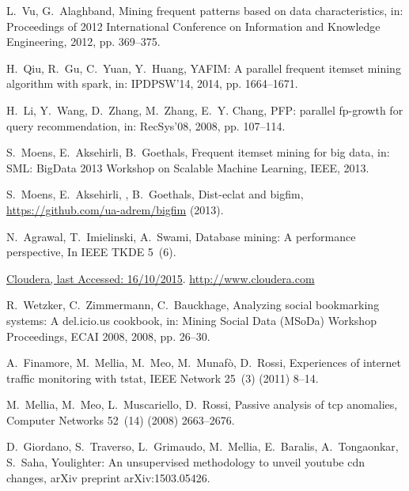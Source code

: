 \documentclass[preprint,review,12pt]{elsarticle}
\begin{document}
\begin{thebibliography}{10}
L.~Vu, G.~Alaghband, Mining frequent patterns based on data characteristics,
  in: Proceedings of 2012 International Conference on Information and Knowledge
  Engineering, 2012, pp. 369--375.

H.~Qiu, R.~Gu, C.~Yuan, Y.~Huang, {YAFIM}: A parallel frequent itemset mining
  algorithm with spark, in: IPDPSW'14, 2014, pp. 1664--1671.

H.~Li, Y.~Wang, D.~Zhang, M.~Zhang, E.~Y. Chang, {PFP}: parallel fp-growth for
  query recommendation, in: RecSys'08, 2008, pp. 107--114.

S.~Moens, E.~Aksehirli, B.~Goethals, Frequent itemset mining for big data, in:
  SML: BigData 2013 Workshop on Scalable Machine Learning, IEEE, 2013.

S.~Moens, E.~Aksehirli, , B.~Goethals, Dist-eclat and bigfim,
  \url{https://github.com/ua-adrem/bigfim} (2013).

N.~Agrawal, T.~Imielinski, A.~Swami, Database mining: A performance
  perspective, In IEEE TKDE 5~(6).

\href{http://www.cloudera.com}{{Cloudera, last Accessed: 16/10/2015}}.
\newline\urlprefix\url{http://www.cloudera.com}

R.~Wetzker, C.~Zimmermann, C.~Bauckhage, Analyzing social bookmarking systems:
  A del.icio.us cookbook, in: Mining Social Data (MSoDa) Workshop Proceedings,
  ECAI 2008, 2008, pp. 26--30.

A.~Finamore, M.~Mellia, M.~Meo, M.~Munaf\`o, D.~Rossi, Experiences of internet
  traffic monitoring with tstat, IEEE Network 25~(3) (2011) 8--14.

M.~Mellia, M.~Meo, L.~Muscariello, D.~Rossi, Passive analysis of tcp anomalies,
  Computer Networks 52~(14) (2008) 2663--2676.

D.~Giordano, S.~Traverso, L.~Grimaudo, M.~Mellia, E.~Baralis, A.~Tongaonkar,
  S.~Saha, Youlighter: An unsupervised methodology to unveil youtube cdn
  changes, arXiv preprint arXiv:1503.05426.

\end{thebibliography}
\end{document}
